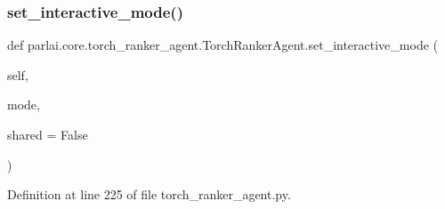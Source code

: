 \subsubsection{\texorpdfstring{set\+\_\+interactive\+\_\+mode()}{set\_interactive\_mode()}}
{\footnotesize\ttfamily def parlai.\+core.\+torch\+\_\+ranker\+\_\+agent.\+Torch\+Ranker\+Agent.\+set\+\_\+interactive\+\_\+mode (\begin{DoxyParamCaption}\item[{}]{self,  }\item[{}]{mode,  }\item[{}]{shared = {\ttfamily False} }\end{DoxyParamCaption})}



Definition at line 225 of file torch\+\_\+ranker\+\_\+agent.\+py.


